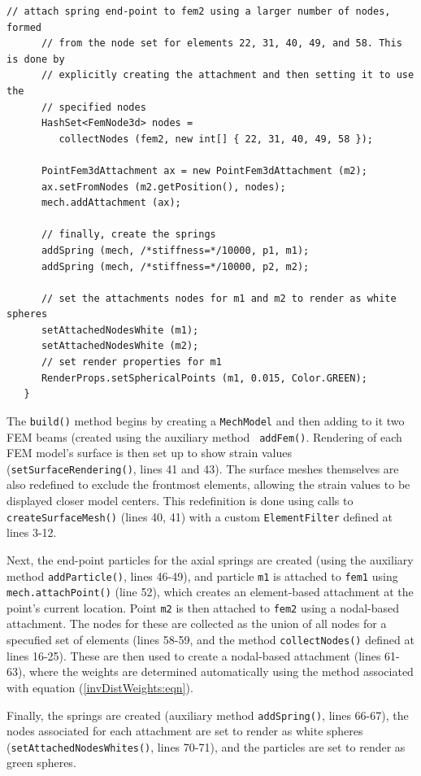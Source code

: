 \begin{lstlisting}[]
      // attach spring end-point to fem2 using a larger number of nodes, formed
      // from the node set for elements 22, 31, 40, 49, and 58. This is done by
      // explicitly creating the attachment and then setting it to use the
      // specified nodes
      HashSet<FemNode3d> nodes =
         collectNodes (fem2, new int[] { 22, 31, 40, 49, 58 });

      PointFem3dAttachment ax = new PointFem3dAttachment (m2);
      ax.setFromNodes (m2.getPosition(), nodes);
      mech.addAttachment (ax);

      // finally, create the springs
      addSpring (mech, /*stiffness=*/10000, p1, m1);
      addSpring (mech, /*stiffness=*/10000, p2, m2);

      // set the attachments nodes for m1 and m2 to render as white spheres
      setAttachedNodesWhite (m1);
      setAttachedNodesWhite (m2);
      // set render properties for m1
      RenderProps.setSphericalPoints (m1, 0.015, Color.GREEN);
   }
\end{lstlisting}
\lstset{numbers=none}
The {\tt build()} method begins by creating a {\tt MechModel} and then
adding to it two FEM beams (created using the auxiliary method {\tt
addFem()}. Rendering of each FEM model's surface is then set up to
show strain values ({\tt setSurfaceRendering()}, lines 41 and 43).
The surface meshes themselves are also redefined to exclude the
frontmost elements, allowing the strain values to be displayed closer
model centers. This redefinition is done using calls to {\tt
createSurfaceMesh()} (lines 40, 41) with a custom {\tt ElementFilter}
defined at lines 3-12.

Next, the end-point particles for the axial springs are created (using
the auxiliary method {\tt addParticle()}, lines
46-49), and particle {\tt m1} is attached to {\tt fem1} using {\tt
mech.attachPoint()} (line 52), which creates an element-based
attachment at the point's current location. Point {\tt m2} is then
attached to {\tt fem2} using a nodal-based attachment.  The nodes for
these are collected as the union of all nodes for a specufied set of
elements (lines 58-59, and the method {\tt collectNodes()} defined at
lines 16-25). These are then used to create a nodal-based attachment
(lines 61-63), where the weights are determined automatically using
the method associated with equation (\ref{invDistWeights:eqn}).

Finally, the springs are created (auxiliary method {\tt addSpring()},
lines 66-67), the nodes associated for each attachment are set to
render as white spheres ({\tt setAttachedNodesWhites()}, lines 70-71),
and the particles are set to render as green spheres.


